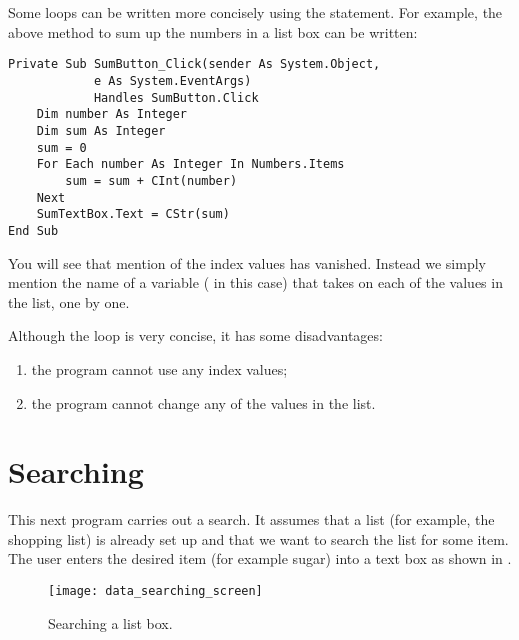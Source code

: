 	\section{}
		Some  loops can be written more concisely using the  statement. For example, the above method to sum up the numbers in a list box can be written:
		\begin{lstlisting}
Private Sub SumButton_Click(sender As System.Object,
			e As System.EventArgs)
			Handles SumButton.Click
	Dim number As Integer
	Dim sum As Integer
	sum = 0
	For Each number As Integer In Numbers.Items
		sum = sum + CInt(number)
	Next
	SumTextBox.Text = CStr(sum)
End Sub
		\end{lstlisting}
		You will see that mention of the index values has vanished. Instead we simply mention the name of a variable ( in this case) that takes on each of the values in the list, one by one.
		
		Although the  loop is very concise, it has some disadvantages:
		\begin{enumerate}
			\item	the program cannot use any index values;
			\item	the program cannot change any of the values in the list.
		\end{enumerate}


	\section{Searching}
		This next program carries out a search. It assumes that a list (for example, the shopping list) is already set up and that we want to search the list for some item. The user enters the desired item (for example sugar) into a text box as shown in .
		\begin{figure}[bth]
			\centering
			\texttt{[image: data\_searching\_screen]}
			\caption{Searching a list box.}
			\label{fig:data_searching_screen}
		\end{figure}

